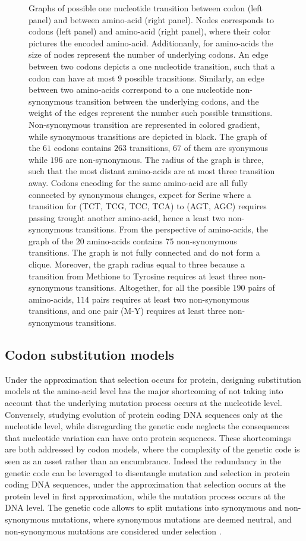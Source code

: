 \begin{figure}[htbp!]
	\caption[Graphs of codon and amino-acid transitions]{
		\label{fig:graph-codons-aa}
		Graphs of possible one nucleotide transition between codon (left panel) and between amino-acid (right panel).
		Nodes corresponds to codons (left panel) and amino-acid (right panel), where their color pictures the encoded amino-acid.
		Additionanly, for amino-acids the size of nodes represent the number of underlying codons.
		An edge between two codons depicts a one nucleotide transition, such that a codon can have at most $9$ possible transitions.
		Similarly, an edge between two amino-acids correspond to a one nucleotide non-synonymous transition between the underlying codons, and the weight of the edges represent the number such possible transitions.
		Non-synonymous transition are represented in colored gradient, while synonymous transitions are depicted in black.
		The graph of the $61$ codons contains $263$ transitions, $67$ of them are syonymous while $196$ are non-synonymous.
		The radius of the graph is three, such that the most distant amino-acids are at most three transition away.
		Codons encoding for the same amino-acid are all fully connected by synonymous changes, expect for Serine where a transition for (TCT, TCG, TCC,	TCA) to (AGT, AGC) requires passing trought another amino-acid, hence a least two non-synonymous transitions.
		From the perspective of amino-acids, the graph of the $20$ amino-acids contains $75$ non-synonymous transitions.
		The graph is not fully connected and do not form a clique. Moreover, the graph radius equal to three because a transition from Methione to Tyrosine requires at least three non-synonymous transitions.
		Altogether, for all the possible $190$ pairs of amino-acids, $114$ pairs requires at least two non-synonymous transitions, and one pair (M-Y) requires at least three non-synonymous transitions.
	}
\end{figure}

\subsection{Codon substitution models}
Under the approximation that selection occurs for protein, designing substitution models at the amino-acid level has the major shortcoming of not taking into account that the underlying mutation process occurs at the nucleotide level.
Conversely, studying evolution of protein coding \acrshort{DNA} sequences only at the nucleotide level, while disregarding the genetic code neglects the consequences that nucleotide variation can have onto protein sequences.
These shortcomings are both addressed by \gls{codon} models, where the complexity of the genetic code is seen as an asset rather than an encumbrance.
Indeed the redundancy in the genetic code can be leveraged to disentangle mutation and selection in protein coding \acrshort{DNA} sequences, under the approximation that selection occurs at the protein level in first approximation, while the mutation process occurs at the \acrshort{DNA} level.
The genetic code allows to split mutations into synonymous and non-synonymous mutations, where synonymous mutations are deemed neutral, and non-synonymous mutations are considered under selection \citep{Muse1994,Goldman1994}.

